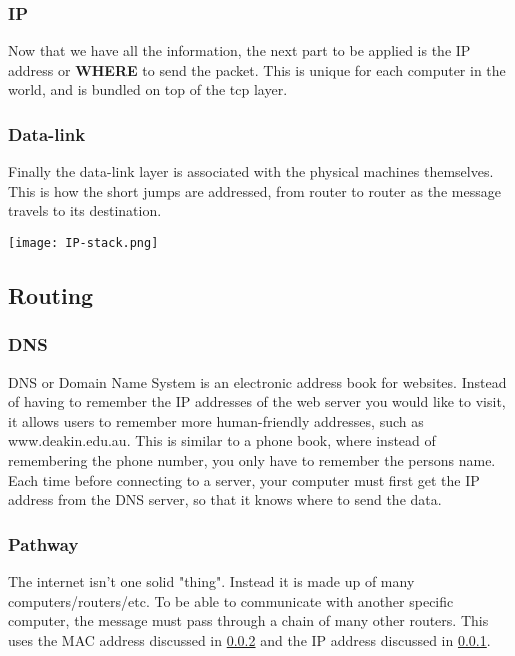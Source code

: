 \documentclass[portfolio.tex]{subfiles}
\begin{document}
				\subsubsection{IP}
					\label{ip} Now that we have all the information, the next part to be applied is the IP address or \textbf{WHERE} to send the packet. This is unique for each computer in the world, and is bundled on top of the tcp layer.

				\subsubsection{Data-link}
					\label{mac}
					Finally the data-link layer is associated with the physical machines themselves. This is how the short jumps are addressed, from router to router as the message travels to its destination.

				\begin{center}
					\texttt{[image: IP-stack.png]}\\
					\autocite{network-topology}
				\end{center}

			\subsection{Routing}
				\subsubsection{DNS}
					DNS or Domain Name System is an electronic address book for websites. Instead of having to remember the IP addresses of the web server you would like to visit, it allows users to remember more human-friendly addresses, such as www.deakin.edu.au. \autocite{stanford-internet} This is similar to a phone book, where instead of remembering the phone number, you only have to remember the persons name. \\

					Each time before connecting to a server, your computer must first get the IP address from the DNS server, so that it knows where to send the data.
				\subsubsection{Pathway}
					The internet isn't one solid "thing". Instead it is made up of many computers/routers/etc. To be able to communicate with another specific computer, the message must pass through a chain of many other routers. This uses the MAC address discussed in \ref{mac} and the IP address discussed in \ref{ip}. \\
\end{document}
